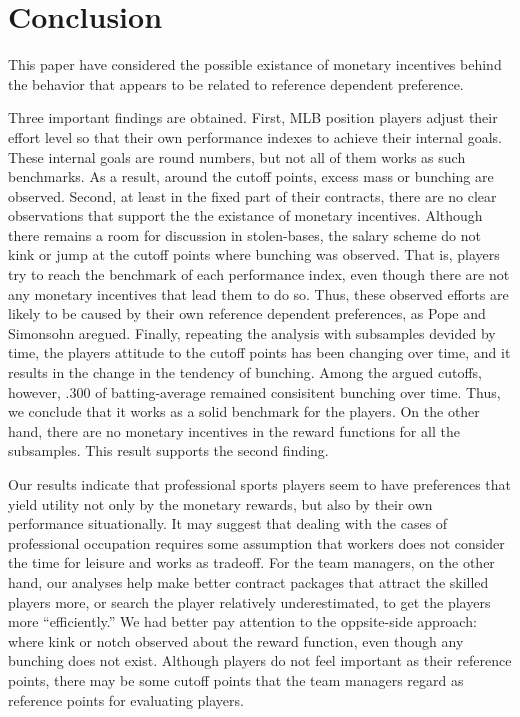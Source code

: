 \documentclass[dvipdfmx, 12pt]{article}
\begin{document}





\section{Conclusion}

This paper have considered the possible existance of monetary incentives behind the behavior that appears to be related to reference dependent preference.

Three important findings are obtained. First, MLB position players adjust their effort level so that their own performance indexes to achieve their internal goals. These internal goals are round numbers, but not all of them works as such benchmarks. As a result, around the cutoff points, excess mass or bunching are observed. Second, at least in the fixed part of their contracts, there are no clear observations that support the the existance of monetary incentives. Although there remains a room for discussion in stolen-bases, the salary scheme do not kink or jump at the cutoff points where bunching was observed. That is, players try to reach the benchmark of each performance index, even though there are not any monetary incentives that lead them to do so. Thus, these observed efforts are likely to be caused by their own reference dependent preferences, as Pope and Simonsohn aregued. Finally, repeating the analysis with subsamples devided by time, the players attitude to the cutoff points has been changing over time, and it results in the change in the tendency of bunching. Among the argued cutoffs, however, .300 of batting-average remained consisitent bunching over time. Thus, we conclude that it works as a solid benchmark for the players. On the other hand, there are no monetary incentives in the reward functions for all the subsamples. This result supports the second finding.

Our results indicate that professional sports players seem to have preferences that yield utility not only by the monetary rewards, but also by their own performance situationally. It may suggest that dealing with the cases of professional occupation requires some assumption that workers does not consider the time for leisure and works as tradeoff. For the team managers, on the other hand, our analyses help make better contract packages that attract the skilled players more, or search the player relatively underestimated, to get the players more ``efficiently.'' We had better pay attention to the oppsite-side approach: where kink or notch observed about the reward function, even though any bunching does not exist. Although players do not feel important as their reference points, there may be some cutoff points that the team managers regard as reference points for evaluating players.
\end{document}
